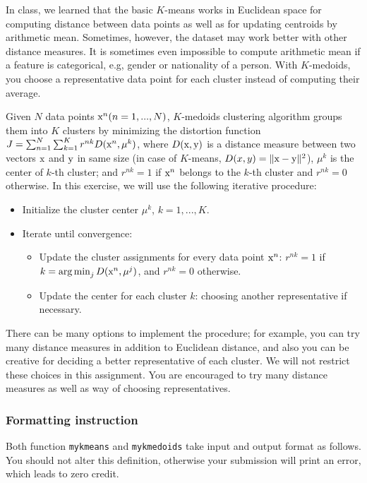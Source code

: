 \documentclass[twoside,10pt]{article}
\begin{document}
In class, we learned that the basic $K$-means works in Euclidean space for computing distance between data points as well as for updating centroids by arithmetic mean. Sometimes, however, the dataset may work better with other distance measures. It is sometimes even impossible to compute arithmetic mean if a feature is categorical, e.g, gender or nationality of a person. With $K$-medoids, you choose a representative data point for each cluster instead of computing their average.

Given $N$ data points $\text x^n (n = 1, ..., N)$, $K$-medoids clustering algorithm groups them into $K$ clusters by minimizing the distortion function $J = \sum_{n=1}^N \sum_{k=1}^K r^{nk} D(\text x^n, \mu^k)$,
where $D(\text x, \text y)$ is a distance measure between two vectors $\text x$ and $\text y$ in same size (in case of $K$-means, $D(x, y) = \| \text x - \text y \|^2$), $\mu^k$ is the center of $k$-th cluster; and $r^{nk} = 1$ if $\text x^n$ belongs to the $k$-th cluster and $r^{nk} = 0$ otherwise. In this exercise, we will use the following iterative procedure:

\begin{itemize}
  \item Initialize the cluster center $\mu^k$, $k = 1, ..., K$.
  \item Iterate until convergence:
  \begin{itemize}
    \item Update the cluster assignments for every data point $\text x^n$: $r^{nk} = 1$ if $k = \argmin_j D(\text x^n, \mu^j)$, and $r^{nk} = 0$ otherwise.
    \item Update the center for each cluster $k$: choosing another representative if necessary.
  \end{itemize}
\end{itemize}

There can be many options to implement the procedure; for example, you can try many distance measures in addition to Euclidean distance, and also you can be creative for deciding a better representative of each cluster. We will not restrict these choices in this assignment. You are encouraged to try many distance measures as well as way of choosing representatives.


\subsubsection*{Formatting instruction}

Both function \texttt{mykmeans} and \texttt{mykmedoids} take input and output format as follows. You should not alter this definition, otherwise your submission will print an error, which leads to zero credit.\\
\end{document}
